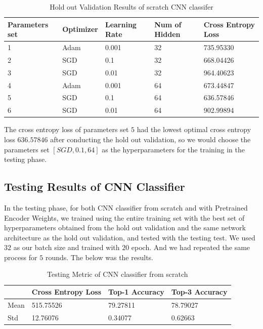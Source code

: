 \documentclass{article}
\begin{document}
\begin{table}[htb]
\caption{Hold out Validation Results of scratch CNN classifer}
	\label{sample-table}
	\centering
\begin{tabular}{lllll}
\toprule
		\cmidrule{1-5}
		Parameters set& Optimizer & Learning Rate & Num of Hidden & Cross Entropy Loss 		\\
		\midrule
 			1 & Adam & 0.001 & 32 & 735.95330 \\
 			2 & SGD & 0.1 & 32 &  668.04426\\
 			3 & SGD & 0.01 & 32 & 964.40623 \\
 			4 & Adam & 0.001 & 64 & 673.44847 \\
 			5 & SGD & 0.1 & 64 &  636.57846\\
 			6 & SGD & 0.01 & 64 & 902.99894 \\
\bottomrule
\end{tabular}
\end{table}

The cross entropy loss of parameters set $5$ had the lowest optimal cross entropy loss $636.57846$ after conducting the hold out validation, so we would choose the parameters set $[SGD, 0.1, 64]$ as the hyperparameters for the training in the testing phase.


\subsection{Testing Results of CNN Classifier}

In the testing phase, for both CNN classifier from scratch and with Pretrained Encoder Weights, we trained using the entire training set with the best set of hyperparameters obtained from the hold out validation and the same network architecture as the hold out validation, and tested with the testing test. We used $32$ as our batch size and trained with $20$ epoch. And we had repeated the same process for $5$ rounds. The below was the results.

\begin{table}[htb]
\caption{Testing Metric of CNN classifier from scratch}
	\label{sample-table}
	\centering
\begin{tabular}{llll}
\toprule
		\cmidrule{1-4}
		& Cross Entropy Loss & Top-1 Accuracy & Top-3 Accuracy 		\\
	\midrule
 	Mean & 515.75526 & 79.27811& 78.79027 \\
 	Std & 12.76076 & 0.34077 & 0.62663\\
\bottomrule
\end{tabular}
\end{table}
\end{document}
